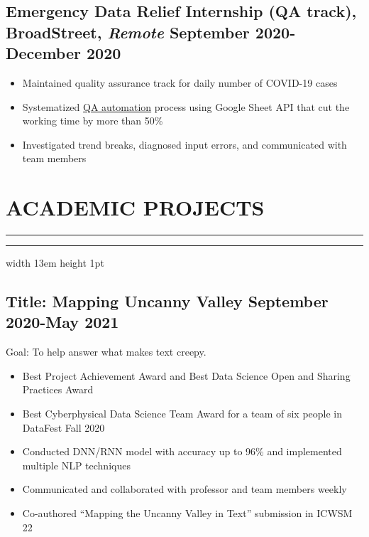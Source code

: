 \documentclass[11pt]{article}
\newcommand{\divider}[1]{%
	\vskip-2pt %
	{%
		\color{black}%
		\hrule%
	}%
	\nointerlineskip%
	\noindent%
	{%
		\color{black}%
		\hrule width #1 height 1pt%
	}%
	\vskip5pt%
}
\begin{document}
\subsection*{Emergency Data Relief Internship (QA track){\normalfont, BroadStreet, \textit{Remote} \hfill September 2020-December 2020}}
\begin{itemize}
    \setlength\itemsep{-1pt}
    \item Maintained quality assurance track for daily number of COVID-19 cases
    \item Systematized \href{https://github.com/Anthonyive/broadstreet-qa-automation.git}{QA automation} 
        process using Google Sheet API that cut the working time by more than 
        50\%
    \item Investigated trend breaks, diagnosed input errors, and communicated 
        with team members
\end{itemize}

\section*{ACADEMIC PROJECTS}
\divider{13em}

\subsection*{Title: Mapping Uncanny Valley \hfill {\normalfont September 2020-May 2021}}
\noindent
\href{https://github.com/Anthonyive/Research-Mapping-Uncanny-Valley.git}{} Goal: To help answer what makes text creepy.
\begin{itemize}
    \setlength\itemsep{-1pt}
    \item Best Project Achievement Award and Best Data Science Open and 
        Sharing Practices Award
    \item Best Cyberphysical Data Science Team Award for a team of six people 
        in DataFest Fall 2020
    \item Conducted DNN/RNN model with accuracy up to 96\% and implemented 
        multiple NLP techniques
    \item Communicated and collaborated with professor and team members weekly
    \item Co-authored ``Mapping the Uncanny Valley in Text'' submission in 
        ICWSM 22
\end{itemize}
\end{document}
